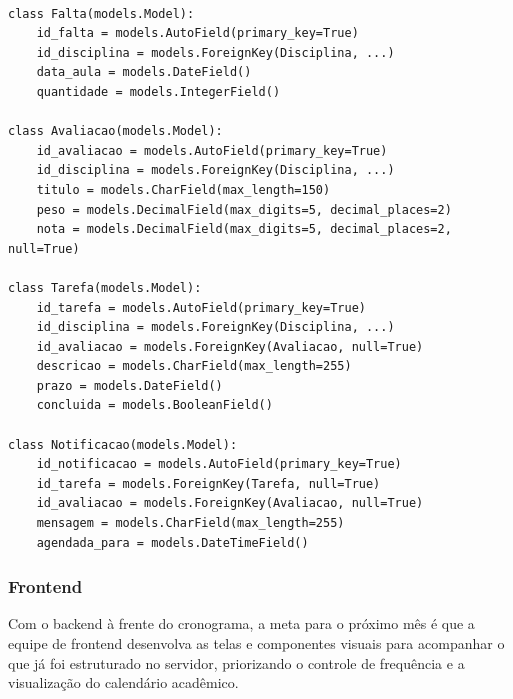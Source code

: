 \documentclass[12pt]{article}
\begin{document}
\begin{verbatim}
    
class Falta(models.Model):
    id_falta = models.AutoField(primary_key=True)
    id_disciplina = models.ForeignKey(Disciplina, ...)
    data_aula = models.DateField()
    quantidade = models.IntegerField()

class Avaliacao(models.Model):
    id_avaliacao = models.AutoField(primary_key=True)
    id_disciplina = models.ForeignKey(Disciplina, ...)
    titulo = models.CharField(max_length=150)
    peso = models.DecimalField(max_digits=5, decimal_places=2)
    nota = models.DecimalField(max_digits=5, decimal_places=2, null=True)

class Tarefa(models.Model):
    id_tarefa = models.AutoField(primary_key=True)
    id_disciplina = models.ForeignKey(Disciplina, ...)
    id_avaliacao = models.ForeignKey(Avaliacao, null=True)
    descricao = models.CharField(max_length=255)
    prazo = models.DateField()
    concluida = models.BooleanField()

class Notificacao(models.Model):
    id_notificacao = models.AutoField(primary_key=True)
    id_tarefa = models.ForeignKey(Tarefa, null=True)
    id_avaliacao = models.ForeignKey(Avaliacao, null=True)
    mensagem = models.CharField(max_length=255)
    agendada_para = models.DateTimeField()
\end{verbatim}

\subsubsection{Frontend}
Com o backend à frente do cronograma, a meta para o próximo mês é que a equipe de frontend desenvolva as telas e componentes visuais para acompanhar o que já foi estruturado no servidor, priorizando o controle de frequência e a visualização do calendário acadêmico.
\end{document}
